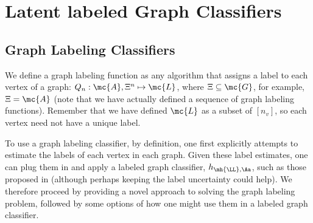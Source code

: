 \documentclass[10pt,journal,cspaper,compsoc]{IEEEtran}
\begin{document}


% 
% 




\section{Latent labeled Graph Classifiers} %
\label{sec:algs}

\subsection{Graph Labeling Classifiers} %
\label{sec:quadratic_assignment_problem}

We define a graph labeling function as any algorithm that assigns a label to each vertex of a graph: $Q_n: \mc{A}, \Xi^n \mapsto \mc{L}$, where $\Xi \subseteq \mc{G}$, for example, $\Xi=\mc{A}$ (note that we have actually defined a sequence of graph labeling functions).  Remember that we have defined $\mc{L}$ as a subset of $[n_v]$, so each vertex need not have a unique label.  

To use a graph labeling classifier, by definition, one first explicitly attempts to estimate the labels of each vertex in each graph.  Given these label estimates, one can plug them in and apply a labeled graph classifier, $h_{\mh{\LL},\Aa}$, such as those proposed in \cite{Vogelstein2011} (although perhaps keeping the label uncertainty could help).  We therefore proceed by providing a novel approach to solving the graph labeling problem, followed by some options of how one might use them in a labeled graph classifier.
\end{document}
